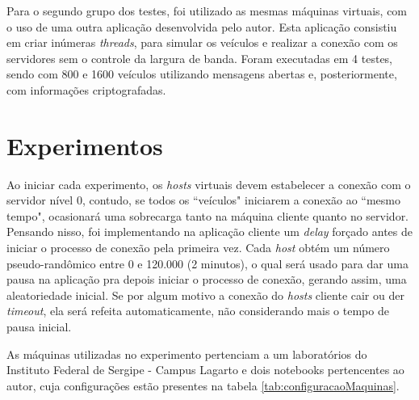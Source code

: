 \documentclass[
	12pt,				%
	oneside,			%
	a4paper,			%
	english,			%
	brazil				%
	]{abntex2ppgsi}
\begin{document}
Para o segundo grupo dos testes, foi utilizado as mesmas máquinas virtuais, com o uso de uma outra aplicação desenvolvida pelo autor. Esta aplicação consistiu em criar inúmeras \textit{threads}, para simular os veículos e realizar a conexão com os servidores sem o controle da largura de banda. Foram executadas em 4 testes, sendo com 800 e 1600 veículos utilizando mensagens abertas e, posteriormente, com informações criptografadas.

\section{Experimentos}

Ao iniciar cada experimento, os \textit{hosts} virtuais devem estabelecer a conexão com o servidor nível 0, contudo, se todos os ``veículos" iniciarem a conexão ao ``mesmo tempo", ocasionará uma sobrecarga tanto na máquina cliente quanto no servidor. Pensando nisso, foi implementando na aplicação cliente um \textit{delay} forçado antes de iniciar o processo de conexão pela primeira vez. Cada \textit{host} obtém um número pseudo-randômico entre 0 e 120.000 (2 minutos), o qual será usado para dar uma pausa na aplicação pra depois iniciar o processo de conexão, gerando assim, uma aleatoriedade inicial. Se por algum motivo a conexão do \textit{hosts} cliente cair ou der \textit{timeout}, ela será refeita automaticamente, não considerando mais o tempo de pausa inicial. 



As máquinas utilizadas no experimento pertenciam a um laboratórios do Instituto Federal de Sergipe - Campus Lagarto e dois notebooks pertencentes ao autor, cuja configurações estão presentes na tabela \ref{tab:configuracaoMaquinas}.

\end{document}
